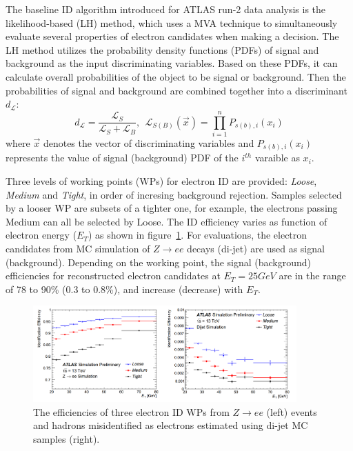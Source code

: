 The baseline ID algorithm introduced for ATLAS run-2 data analysis is the likelihood-based (LH) method, which uses a MVA technique to simultaneously evaluate several properties of electron candidates when making a decision.
The LH method utilizes the probability density functions (PDFs) of signal and background as the input discriminating variables.
Based on these PDFs, it can calculate overall probabilities of the object to be signal or background.
Then the probabilities of signal and background are combined together into a discriminant $d_{\mathcal{L}}$:
\begin{equation}
	d_{\mathcal{L}} = \frac{\mathcal{L}_{S}}{\mathcal{L}_{S} + \mathcal{L}_{B}},
	~~ \mathcal{L}_{S(B)}(\vec{x}) = \prod_{i=1}^{n} P_{s(b),i}(x_{i})	
\end{equation}
where $\vec{x}$ denotes the vector of discriminating variables and $P_{s(b),i}(x_{i})$ represents the value of signal (background) PDF of the $i^{th}$ varaible as $x_{i}$.

Three levels of working points (WPs) for electron ID are provided: \textit{Loose}, \textit{Medium} and \textit{Tight}, in order of incresing background rejection.
Samples selected by a looser WP are subsets of a tighter one, for example, the electrons passing Medium can all be selected by Loose.
The ID efficiency varies as function of electron energy ($E_{T}$) as shown in figure~\ref{fig:ele_IDeff}.
For evaluations, the electron candidates from MC simulation of $Z \rightarrow ee$ decays (di-jet) are used as signal (background).
Depending on the working point, the signal (background) efficiencies for reconstructed electron candidates at $E_{T} = 25 GeV$ are in the range of 78 to 90\% (0.3 to 0.8\%), and increase (decrease) with $E_{T}$.
\begin{figure}[!htb]
  \centering
  \includegraphics[width=0.9\textwidth]{figures/Simulation/ele_id_eff.png}
  \caption{The efficiencies of three electron ID WPs from $Z \rightarrow ee$ (left) events and hadrons misidentified as electrons estimated using di-jet MC samples (right).}
  \label{fig:ele_IDeff}
\end{figure}


